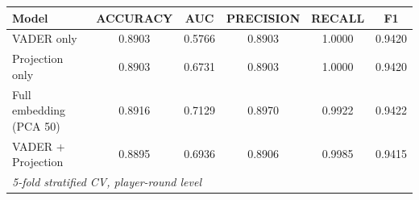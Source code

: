 \begingroup
\centering
\begin{tabular}{lccccc}
   \tabularnewline \midrule \midrule
   Model & ACCURACY & AUC & PRECISION & RECALL & F1 \\
   \midrule
   VADER only & 0.8903 & 0.5766 & 0.8903 & 1.0000 & 0.9420 \\
   Projection only & 0.8903 & 0.6731 & 0.8903 & 1.0000 & 0.9420 \\
   Full embedding (PCA 50) & 0.8916 & 0.7129 & 0.8970 & 0.9922 & 0.9422 \\
   VADER + Projection & 0.8895 & 0.6936 & 0.8906 & 0.9985 & 0.9415 \\
   \midrule \midrule
   \multicolumn{6}{l}{\emph{5-fold stratified CV, player-round level}}\\
\end{tabular}
\par\endgroup
